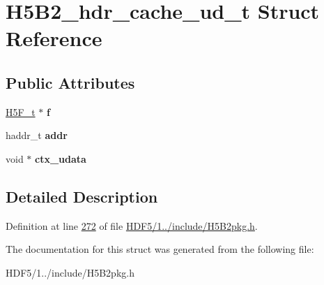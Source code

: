 \hypertarget{struct_h5_b2__hdr__cache__ud__t}{}\section{H5\+B2\+\_\+hdr\+\_\+cache\+\_\+ud\+\_\+t Struct Reference}
\label{struct_h5_b2__hdr__cache__ud__t}
\subsection*{Public Attributes}
\begin{DoxyCompactItemize}
\item 
\mbox{\label{struct_h5_b2__hdr__cache__ud__t_ace9245cf6469268073aa232c4ace7056}} 
\hyperlink{struct_h5_f__t}{H5\+F\+\_\+t} $\ast$ {\bfseries f}
\item 
\mbox{\label{struct_h5_b2__hdr__cache__ud__t_a19fb16ef2a90b4d35cb0c516985f8857}} 
haddr\+\_\+t {\bfseries addr}
\item 
\mbox{\label{struct_h5_b2__hdr__cache__ud__t_aca406652622248863f1b0d5060c0a27e}} 
void $\ast$ {\bfseries ctx\+\_\+udata}
\end{DoxyCompactItemize}


\subsection{Detailed Description}


Definition at line \hyperlink{_h_d_f5_21_810_81_2include_2_h5_b2pkg_8h_source_l00272}{272} of file \hyperlink{_h_d_f5_21_810_81_2include_2_h5_b2pkg_8h_source}{H\+D\+F5/1../include/\+H5\+B2pkg.\+h}.



The documentation for this struct was generated from the following file\+:\begin{DoxyCompactItemize}
\item 
H\+D\+F5/1../include/\+H5\+B2pkg.\+h\end{DoxyCompactItemize}

